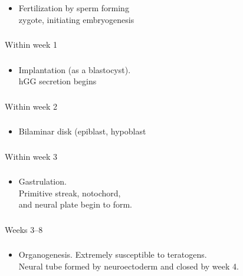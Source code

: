 \documentclass[11pt]{beamer}
\begin{document}
\begin{frame}
 \frametitle{}
\begin{itemize}
\item{Fertilization by sperm forming \\ zygote, initiating embryogenesis}
\end{itemize}
\end{frame}

\begin{frame}
 \frametitle{}
Within week 1
\end{frame}

\begin{frame}
 \frametitle{}
\begin{itemize}
\item{Implantation (as a blastocyst). \\ hGG secretion begins }
\end{itemize}
\end{frame}

\begin{frame}
 \frametitle{}
Within week 2
\end{frame}

\begin{frame}
 \frametitle{}
\begin{itemize}
\item{Bilaminar disk (epiblast, hypoblast}
\end{itemize}
\end{frame}

\begin{frame}
 \frametitle{}
Within week 3
\end{frame}

\begin{frame}
 \frametitle{}
\begin{itemize}
\item{Gastrulation. \\ Primitive streak,	notochord, \\ and neural plate begin to form.}
\end{itemize}
\end{frame}

\begin{frame}
 \frametitle{}
Weeks 3–8
\end{frame}

\begin{frame}
 \frametitle{}
\begin{itemize}
\item{Organogenesis. Extremely susceptible to teratogens. \\ Neural tube formed by neuroectoderm and closed by week 4.}
\end{itemize}
\end{frame}
\end{document}
